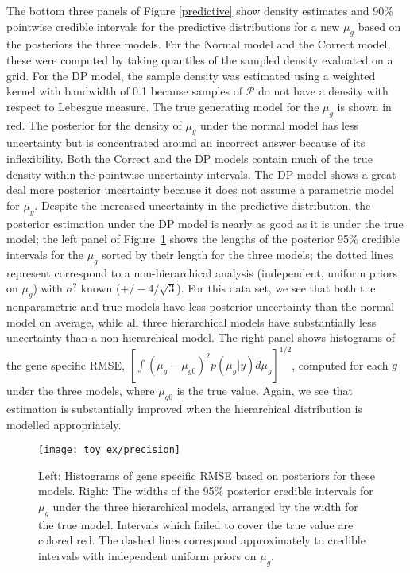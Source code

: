 The bottom three panels of Figure \ref{predictive} show density estimates and 90\% pointwise credible intervals for the predictive distributions for a new $\mu_g$ based on the posteriors the three models. For the Normal model and the Correct model, these were computed by taking quantiles of the sampled density evaluated on a grid. For the DP model, the sample density was estimated using a weighted kernel with bandwidth of 0.1 because samples of $\mathcal{P}$ do not have a density with respect to Lebesgue measure. The true generating model for the $\mu_g$ is shown in red. The posterior for the density of $\mu_g$ under the normal model has less uncertainty but is concentrated around an incorrect answer because of its inflexibility. Both the Correct and the DP models contain much of the true density within the pointwise uncertainty intervals. The DP model shows a great deal more posterior uncertainty because it does not assume a parametric model for $\mu_g$. Despite the increased uncertainty in the predictive distribution, the posterior estimation under the DP model is nearly as good as it is under the true model; the left panel of Figure~\ref{precision} shows the lengths of the posterior 95\% credible intervals for the $\mu_g$ sorted by their length for the three models; the dotted lines represent correspond to a non-hierarchical analysis (independent, uniform priors on $\mu_g$) with $\sigma^2$ known ($+/- 4/\sqrt{3}$). For this data set, we see that both the nonparametric and true models have less posterior uncertainty than the normal model on average, while all three hierarchical models have substantially less uncertainty than a non-hierarchical model. The right panel shows histograms of the gene specific RMSE, $[\int (\mu_g - \mu_{g0})^2 p(\mu_g|y) d\mu_g]^{1/2}$, computed for each $g$ under the three models, where $\mu_{g0}$ is the true value. Again, we see that estimation is substantially improved when the hierarchical distribution is modelled appropriately.


\begin{figure}[h!]
\centering
\texttt{[image: toy\_ex/precision]}
\begin{minipage}{.8\textwidth}
\caption{\small Left: Histograms of gene specific RMSE based on posteriors for these models. Right: The widths of the 95\% posterior credible intervals for $\mu_g$ under the three hierarchical models, arranged by the width for the true model. Intervals which failed to cover the true value are colored red. The dashed lines correspond approximately to credible intervals with independent uniform priors on $\mu_g$.}
\label{precision}
\end{minipage}
\end{figure}


